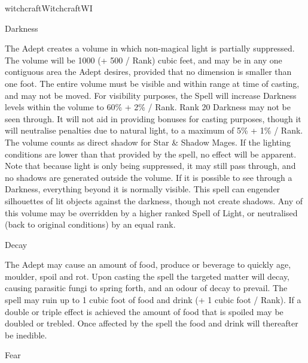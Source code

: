 \begin{college}[1.1]{witchcraft}{Witchcraft}{WI}
\begin{spell}[G-2]{Darkness}
\begin{effects}
The Adept creates a volume in which non-magical light is partially
suppressed. The volume will be 1000 (+ 500 / Rank) cubic feet, and may
be in any one contiguous area the Adept desires, provided that no
dimension is smaller than one foot. The entire volume must be visible
and within range at time of casting, and may not be moved. For
visibility purposes, the Spell will increase Darkness levels within
the volume to 60\% + 2\% / Rank. Rank 20 Darkness may not be seen
through. It will not aid in providing bonuses for casting purposes,
though it will neutralise penalties due to natural light, to a maximum
of 5\% + 1\% / Rank. The volume counts as direct shadow for Star \&
Shadow Mages. If the lighting conditions are lower than that provided
by the spell, no effect will be apparent. Note that because light is
only being suppressed, it may still pass through, and no shadows are
generated outside the volume. If it is possible to see through a
Darkness, everything beyond it is normally visible.  This spell can
engender silhouettes of lit objects against the darkness, though not
create shadows. Any of this volume may be overridden by a higher
ranked Spell of Light, or neutralised (back to original conditions) by
an equal rank.
\end{effects}
\end{spell}

\begin{spell}[G-3]{Decay}

\begin{effects}
The Adept may cause an amount of food, produce or beverage to quickly
age, moulder, spoil and rot.  Upon casting the spell the targeted
matter will decay, causing parasitic fungi to spring forth, and an
odour of decay to prevail.  The spell may ruin up to 1 cubic foot of
food and drink (+ 1 cubic foot / Rank).  If a double or triple effect
is achieved the amount of food that is spoiled may be doubled or
trebled.  Once affected by the spell the food and drink will
thereafter be inedible.
\end{effects}
\end{spell}

\begin{spell}[G-4]{Fear}


\end{spell}
\end{college}
